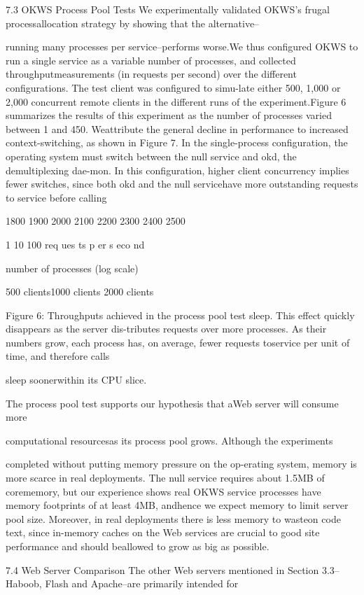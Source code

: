 7.3 OKWS Process Pool Tests
We experimentally validated OKWS's frugal processallocation strategy by showing that the alternative--

running many processes per service--performs worse.We thus configured OKWS to run a single service as a
variable number of processes, and collected throughputmeasurements (in requests per second) over the different
configurations. The test client was configured to simu-late either 500, 1,000 or 2,000 concurrent remote clients
in the different runs of the experiment.Figure 6 summarizes the results of this experiment as
the number of processes varied between 1 and 450. Weattribute the general decline in performance to increased
context-switching, as shown in Figure 7. In the single-process configuration, the operating system must switch
between the null service and okd, the demultiplexing dae-mon. In this configuration, higher client concurrency implies fewer switches, since both okd and the null servicehave more outstanding requests to service before calling

 1800
 1900
 2000
 2100
 2200
 2300
 2400
 2500

 1  10  100
req
ues
ts p
er s
eco
nd

number of processes (log scale)

500 clients1000 clients
2000 clients

Figure 6: Throughputs achieved in the process pool test
sleep. This effect quickly disappears as the server dis-tributes requests over more processes. As their numbers
grow, each process has, on average, fewer requests toservice per unit of time, and therefore calls

sleep soonerwithin its CPU slice.

The process pool test supports our hypothesis that aWeb server will consume more

computational resourcesas its process pool grows. Although the experiments

completed without putting memory pressure on the op-erating system, memory is more scarce in real deployments. The null service requires about 1.5MB of corememory, but our experience shows real OKWS service
processes have memory footprints of at least 4MB, andhence we expect memory to limit server pool size. Moreover, in real deployments there is less memory to wasteon code text, since in-memory caches on the Web services are crucial to good site performance and should beallowed to grow as big as possible.

7.4 Web Server Comparison
The other Web servers mentioned in Section 3.3--Haboob, Flash and Apache--are primarily intended for

